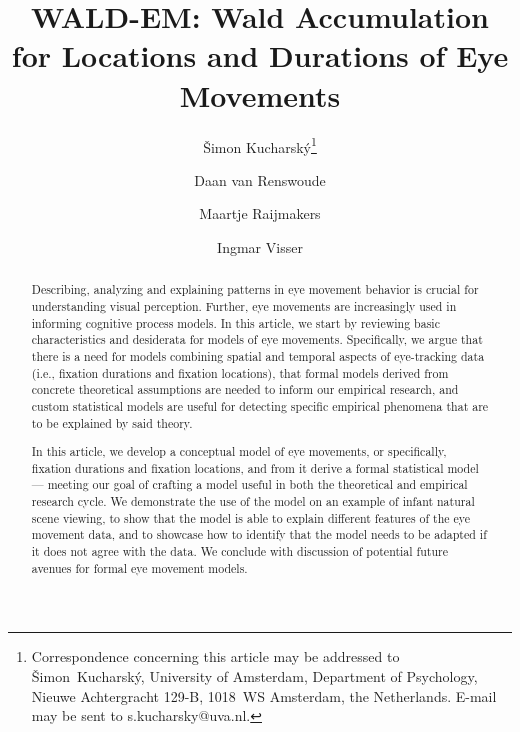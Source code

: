 \documentclass{article}
\begin{document}
\title{WALD-EM: Wald Accumulation for Locations and Durations of Eye Movements}

\author[1]{Šimon Kucharský\thanks{Correspondence concerning this article may be addressed to \v{S}imon~Kucharsk\'{y}, University of Amsterdam, Department of Psychology, Nieuwe Achtergracht 129-B, 1018~WS Amsterdam, the Netherlands. E-mail may be sent to s.kucharsky@uva.nl.}}
\author[2]{Daan van Renswoude}
\author[1,3]{Maartje Raijmakers}
\author[1,4]{Ingmar Visser}
\date{}
\doublespacing
\clearpage\maketitle

\newpage
\begin{abstract}
\normalsize
    Describing, analyzing and explaining patterns in eye movement behavior is crucial for understanding visual perception. Further, eye movements are increasingly used in informing cognitive process models. In this article, we start by reviewing basic characteristics and desiderata for models of eye movements. Specifically, we argue that there is a need for models combining spatial and temporal aspects of eye-tracking data (i.e., fixation durations and fixation locations), that formal models derived from concrete theoretical assumptions are needed to inform our empirical research, and custom statistical models are useful for detecting specific empirical phenomena that are to be explained by said theory.
    
    In this article, we develop a conceptual model of eye movements, or specifically, fixation durations and fixation locations, and from it derive a formal statistical model --- meeting our goal of crafting a model useful in both the theoretical and empirical research cycle. We demonstrate the use of the model on an example of infant natural scene viewing, to show that the model is able to explain different features of the eye movement data, and to showcase how to identify that the model needs to be adapted if it does not agree with the data. We conclude with discussion of potential future avenues for formal eye movement models.
\end{abstract}
\end{document}
